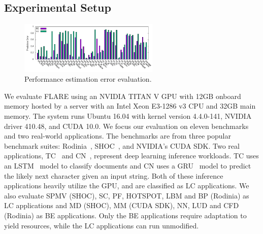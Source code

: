 \subsection{Experimental Setup}
\begin{figure}
        \vspace{-1cm}
        \centering
        \includegraphics[width=\textwidth,height=2.5cm]{figures/new_error_res.png}
        \caption{Performance estimation error evaluation.}
        \label{fig:error}
        \vspace{-.5cm}
\end{figure}
\par We evaluate FLARE using an NVIDIA TITAN V GPU with 12GB onboard memory hosted by a server with an Intel Xeon E3-1286 v3 CPU and 32GB main memory. The system runs Ubuntu 16.04 with kernel version 4.4.0-141, NVIDIA driver 410.48, and CUDA 10.0.
We focus our evaluation on eleven benchmarks and two real-world applications. The benchmarks are from three popular benchmark suites: Rodinia~\cite{Rodinia}, SHOC~\cite{SHOC},
and NVIDIA's CUDA SDK. Two real applications,
TC~\cite{text} and CN~\cite{Sutskever:ICML11}, represent deep learning inference workloads. TC uses an LSTM~\cite{LSTM} model to classify documents and 
CN uses a GRU~\cite{GRU} model to predict the likely next character given an input string. Both of these inference applications heavily utilize the GPU, and are classified as LC applications. We also evaluate SPMV (SHOC), SC, PF, HOTSPOT, LBM and BP (Rodinia) as LC applications and MD (SHOC), MM (CUDA SDK), NN, LUD and CFD (Rodinia) as BE applications. Only the BE applications require adaptation to yield resources, while the LC applications can run unmodified.

